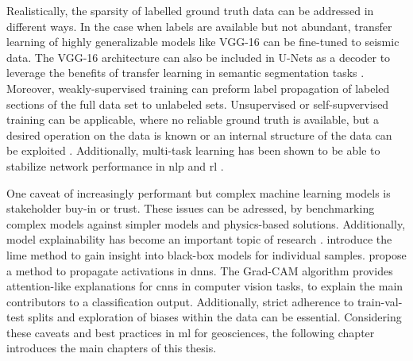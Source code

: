 
Realistically, the sparsity of labelled ground truth data can be addressed in different ways. In the case when labels are available but not abundant, transfer learning of highly generalizable models like VGG-16 can be fine-tuned to seismic data. The VGG-16 architecture can also be included in U-Nets as a decoder to leverage the benefits of transfer learning in semantic segmentation tasks \citep{dramsch2018deep}. Moreover, weakly-supervised training can preform label propagation of labeled sections of the full data set to unlabeled sets. Unsupervised or self-supvervised training can be applicable, where no reliable ground truth is available, but a desired operation on the data is known or an internal structure of the data can be exploited \citep{dramsch20193dwarping}. Additionally, multi-task learning has been shown to be able to stabilize network performance in \acl{nlp} \citep{liu2019multi} and \acl{rl} \citep{yu2019meta}.


One caveat of increasingly performant but complex machine learning models is stakeholder buy-in or trust. These issues can be adressed, by benchmarking complex models against simpler models and physics-based solutions. Additionally, model explainability has become an important topic of research \citep{NIPS2017_7062}. \citet{ribeiro2016should} introduce the \acf{lime} method to gain insight into black-box models for individual samples. \citet{shrikumar2017learning} propose a method to propagate activations in \aclp{dnn}. The Grad-CAM algorithm \citep{selvaraju2017grad} provides attention-like explanations for \acp{cnn} in computer vision tasks, to explain the main contributors to a classification output. Additionally, strict adherence to train-val-test splits and exploration of biases within the data can be essential. Considering these caveats and best practices in \acl{ml} for geosciences, the following chapter introduces the main chapters of this thesis. 